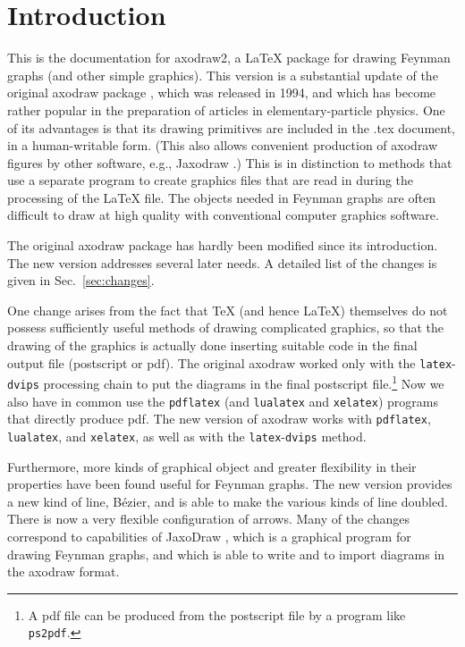 \documentclass[12pt]{article}
\def\program#1{\texttt{#1}}
\begin{document}
\newpage

\tableofcontents

\newpage


\section{Introduction}
\label{sec:intro}

This is the documentation for axodraw2, a \LaTeX{} package for drawing
Feynman graphs (and other simple graphics).  This version is a
substantial update of the original axodraw package \cite{axodraw1},
which was released
in 1994, and which has become rather popular in the preparation of articles in
elementary-particle physics.  One of its advantages is that its
drawing primitives are included in the .tex document, in a
human-writable form. (This also allows convenient production of
axodraw figures by other software, e.g., Jaxodraw
\cite{jaxodraw1,jaxodraw2}.)
This is in distinction to methods that
use a separate program to create graphics files that are read in
during the processing of the \LaTeX{} file.  The objects needed in
Feynman graphs are often difficult to draw at high quality with
conventional computer graphics software.

The original axodraw package has hardly been modified since its
introduction.  The new version addresses several later needs.  A
detailed list of the changes is given in Sec.\ \ref{sec:changes}.

One change arises from the fact that \TeX{} (and hence \LaTeX{})
themselves do not possess sufficiently useful methods of drawing
complicated graphics, so that the drawing of the graphics is actually
done inserting suitable code in the final output file (postscript or
pdf).  The original axodraw worked only with the
\program{latex}-\program{dvips} processing chain to put the diagrams in
the final postscript file.\footnote{A pdf file can be produced from
  the postscript file by a program like \program{ps2pdf}.}  Now we also
have in common use the \program{pdflatex} (and \program{lualatex} and
\program{xelatex}) programs that directly produce pdf.  The new version
of axodraw works with \program{pdflatex}, \program{lualatex}, and
\program{xelatex}, as well as with the \program{latex}-\program{dvips}
method.

Furthermore, more kinds of graphical object and greater flexibility in
their properties have been found useful for Feynman graphs.  The new
version provides a new kind of line, B\'ezier, and is able to make the
various kinds of line doubled.  There is now a very flexible
configuration of arrows.  Many of the changes correspond to
capabilities of JaxoDraw \cite{jaxodraw1,jaxodraw2}, which is a
graphical program for drawing Feynman graphs, and which is able to
write and to import diagrams in the axodraw format.
\end{document}
